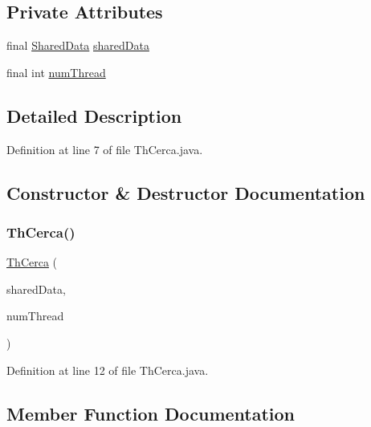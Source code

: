 \subsection*{Private Attributes}
\begin{DoxyCompactItemize}
\item 
final \mbox{\hyperlink{classmain_1_1_shared_data}{Shared\+Data}} \mbox{\hyperlink{classmain_1_1_th_cerca_ac5f1128ef8d0ba91a8214e03732e2662}{shared\+Data}}
\item 
final int \mbox{\hyperlink{classmain_1_1_th_cerca_a647182b81f9dc0ef69645f81af0b6a73}{num\+Thread}}
\end{DoxyCompactItemize}


\subsection{Detailed Description}


Definition at line 7 of file Th\+Cerca.\+java.



\subsection{Constructor \& Destructor Documentation}
\mbox{\label{classmain_1_1_th_cerca_a0a83c1da759198486023f64ed17596ca}} 
\subsubsection{\texorpdfstring{Th\+Cerca()}{ThCerca()}}
{\footnotesize\ttfamily \mbox{\hyperlink{classmain_1_1_th_cerca}{Th\+Cerca}} (\begin{DoxyParamCaption}\item[{\mbox{\hyperlink{classmain_1_1_shared_data}{Shared\+Data}}}]{shared\+Data,  }\item[{int}]{num\+Thread }\end{DoxyParamCaption})}



Definition at line 12 of file Th\+Cerca.\+java.



\subsection{Member Function Documentation}
\mbox{\label{classmain_1_1_th_cerca_a13a43e6d814de94978c515cb084873b1}} 
